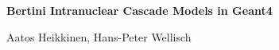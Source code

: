 
\def \PIC {pictures}


\vspace{5.5truecm}

\begin{center}
  \Large {\bf Bertini Intranuclear Cascade Models in {\sc Geant4} }
  \normalsize
  
  \vspace{1.5truecm} Aatos Heikkinen, Hans-Peter Wellisch
\end{center}
\thispagestyle{empty} \newpage

\tableofcontents
\newpage

  
%
  




\begin{appendix} 
%
\end{appendix} 

